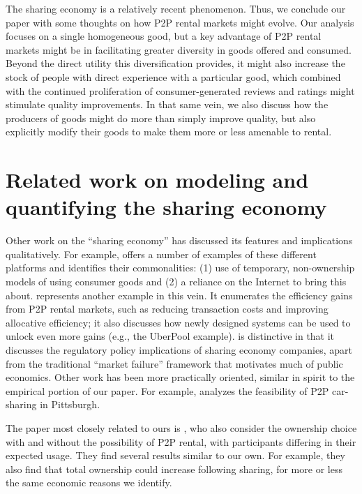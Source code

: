 \documentclass[11pt]{article}
\begin{document}
The sharing economy is a relatively recent phenomenon.
Thus, we conclude our paper with some thoughts on how P2P rental markets might evolve.
Our analysis focuses on a single homogeneous good, but a key advantage of P2P rental markets might be in facilitating greater diversity in goods offered and consumed. 
Beyond the direct utility this diversification provides, it might also increase the stock of people with direct experience with a particular good, which combined with the continued proliferation of consumer-generated reviews and ratings might stimulate quality improvements. 
In that same vein, we also discuss how the producers of goods might do more than simply improve quality, but also explicitly modify their goods to make them more or less amenable to rental.

\section{Related work on modeling and quantifying the sharing economy}

Other work on the ``sharing economy'' has discussed its features and implications qualitatively. 
For example, \cite{belk2014you} offers a number of examples of these different platforms and identifies their commonalities: (1) use of temporary, non-ownership models of using consumer goods and (2) a reliance on the Internet to bring this about. 
\cite{edelman2015efficiencies} represents another example in this vein.
It enumerates the efficiency gains from P2P rental markets, such as reducing transaction costs and improving allocative efficiency;
it also discusses how newly designed systems can be used to unlock even more gains (e.g., the UberPool example). 
\citeauthor{edelman2015efficiencies} is distinctive in that it discusses the regulatory policy implications of sharing economy companies, apart from the traditional ``market failure'' framework that motivates much of public economics.  
Other work has been more practically oriented, similar in spirit to the empirical portion of our paper.
For example, \cite{hampshire2011peer} analyzes the feasibility of P2P car-sharing in Pittsburgh.

The paper most closely related to ours is \cite{benjaafar2015peer},
who also consider the ownership choice with and without the possibility of P2P rental, with participants differing in their expected usage. 
They find several results similar to our own.
For example, they also find that total ownership could increase following sharing, for more or less the same economic reasons we identify.
\end{document}
